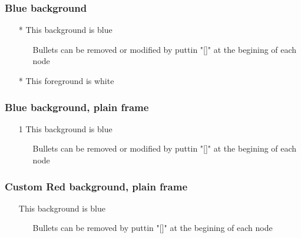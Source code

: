 \documentclass[usepdftitle=false,professionalfonts,compress ]{beamer}
\begin{document}
{

\begin{frame}\frametitle{Blue background}
	\begin{itemize}

		\item [*] This background is blue
		\begin{itemize}

			\item [] Bullets can be removed or modified by puttin "[]" at the begining of each node
		\end{itemize}
		\item [*] \color{white} This foreground is white
	\end{itemize}

\end{frame}
}





{

\begin{frame}[plain]\frametitle{Blue background, plain frame}
	\begin{itemize}

		\item [1] This background is blue
		\begin{itemize}

			\item [] Bullets can be removed or modified by puttin "[]" at the begining of each node
		\end{itemize}
	\end{itemize}

\end{frame}
}





{

\begin{frame}[plain]\frametitle{Custom Red background, plain frame}
	\begin{itemize}

		\item [] This background is blue
		\begin{itemize}

			\item [] Bullets can be removed by puttin "[]" at the begining of each node
		\end{itemize}
	\end{itemize}

\end{frame}
}
\end{document}
